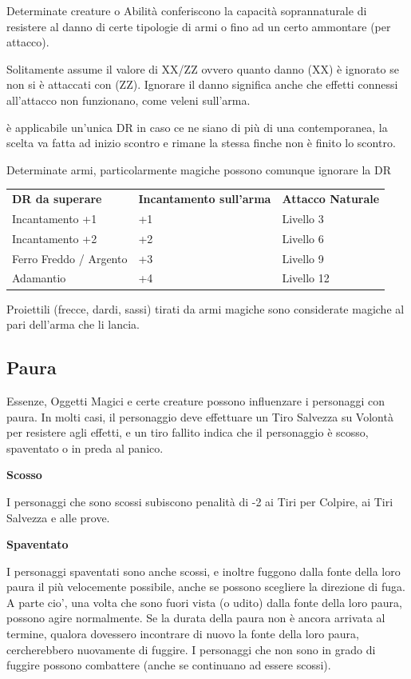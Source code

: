 \documentclass[a4paper,11pt,twoside,openany]{book}
\begin{document}
{Determinate creature o Abilità conferiscono la capacità soprannaturale di resistere al danno di certe tipologie di armi o fino ad un certo ammontare (per attacco).

Solitamente assume il valore di XX/ZZ ovvero quanto danno (XX) è ignorato se non si è attaccati con (ZZ). Ignorare il danno significa anche che effetti connessi all'attacco non funzionano, come veleni sull'arma.

è applicabile un'unica DR in caso ce ne siano di più di una contemporanea, la scelta va fatta ad inizio scontro e rimane la stessa finche non è finito lo scontro.

Determinate armi, particolarmente magiche possono comunque ignorare la DR 

\bigskip

\begin{tabular}{lll}
\toprule
\textbf{DR da superare} & \textbf{Incantamento sull'arma} & \textbf{Attacco Naturale}\tabularnewline
Incantamento +1 & +1 & Livello 3\tabularnewline
Incantamento +2 & +2 & Livello 6\tabularnewline
Ferro Freddo / Argento & +3 & Livello 9\tabularnewline
Adamantio & +4 & Livello 12\tabularnewline

\end{tabular}

Proiettili (frecce, dardi, sassi) tirati da armi magiche sono considerate
magiche al pari dell'arma che li lancia.



\subsection{Paura}

\label{paura}

Essenze, Oggetti Magici e certe creature possono influenzare i personaggi con paura. In molti casi, il personaggio deve effettuare un Tiro Salvezza su Volontà per resistere agli effetti, e un tiro fallito indica che il personaggio è scosso, spaventato o in preda al panico.

\textbf{Scosso}

I personaggi che sono scossi subiscono penalità di -2 ai Tiri per Colpire, ai Tiri Salvezza e alle prove.

\textbf{Spaventato}

I personaggi spaventati sono anche scossi, e inoltre fuggono dalla fonte della loro paura il più velocemente possibile, anche se possono scegliere la direzione di fuga. A parte cio', una volta che sono fuori vista (o udito) dalla fonte della loro paura, possono agire normalmente. Se la durata della paura non è ancora arrivata al termine, qualora dovessero incontrare di nuovo la fonte della loro paura, cercherebbero nuovamente di fuggire. I personaggi che non sono in grado di fuggire possono combattere (anche se continuano ad essere scossi).

}
\end{document}
